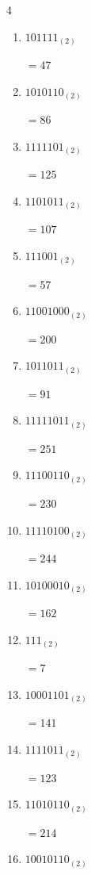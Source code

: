 \begin{multicols}{4}
\begin{enumerate}
        $=199$

  \item $101111_{(2)}$

        $=47$

  \item $1010110_{(2)}$

        $=86$

  \item $1111101_{(2)}$

        $=125$

  \item $1101011_{(2)}$

        $=107$

  \item $111001_{(2)}$

        $=57$

  \item $11001000_{(2)}$

        $=200$

  \item $1011011_{(2)}$

        $=91$

  \item $11111011_{(2)}$

        $=251$

  \item $11100110_{(2)}$

        $=230$

\columnbreak %

\resetques

  \item $11110100_{(2)}$

        $=244$

  \item $10100010_{(2)}$

        $=162$

  \item $111_{(2)}$

        $=7$

  \item $10001101_{(2)}$

        $=141$

  \item $1111011_{(2)}$

        $=123$

  \item $11010110_{(2)}$

        $=214$

  \item $10010110_{(2)}$


\end{enumerate}
\end{multicols}
